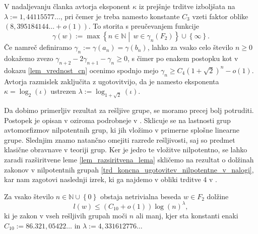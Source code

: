 V nadaljevanju članka \cite[str.~5--9]{Elkasapy_Thom_2013} avtorja eksponent $\kappa$ iz prejšnje trditve izboljšata na $\lambda := 1{,}44115577 \ldots$, pri čemer je treba namesto konstante $C_3$ vzeti faktor oblike $(8{,}395184144 \ldots + o(1))$. To storita s preučevanjem funkcije \begin{equation*}
\gamma(w) := \max \left\{ n \in  \mathbb{N}  \middle|\, w \in \gamma_{n}(F_2) \right\} \cup \left\{ \infty\right\}. 
\end{equation*}  
Če namreč definiramo $\gamma_n := \gamma(a_{n}) = \gamma(b_{n})$, lahko za vsako celo število $n \ge 0$ dokažemo zvezo $\gamma_{n + 2} - 2 \gamma_{n+1}  - \gamma_{n} \ge  0$, s čimer po enakem postopku kot v dokazu \ref{lem_vrednost_cn} ocenimo spodnjo mejo $\gamma_n \ge C_4 (1 + \sqrt{2})^{n} - o(1)$.
Avtorja razmislek zaključita z ugotovitvijo, da je namesto eksponenta $\kappa = \log_2( \iota)$ ustrezen $\lambda := \log_{1 + \sqrt{2}}(\iota)$.

Da dobimo primerljiv rezultat za rešljive grupe, se moramo precej bolj potruditi. Postopek je opisan v \cite[str.~3--4]{Thom_2015} oziroma podrobneje v \cite[str.~19--25]{Schneider_2016}. Sklicuje se na lastnosti grup avtomorfizmov nilpotentnih grup, ki jih vložimo
v primerne splošne linearne grupe. Slednjim znamo natančno omejiti razrede rešljivosti, saj so predmet klasične obravnave v teoriji grup. Ker je jedro te vložitve nilpotentno, se lahko zaradi razširitvene leme \ref{lem_razsiritvena_lema} skličemo na rezultat o dolžinah zakonov v nilpotentnih grupah \ref{trd_koncna_ugotovitev_nilpotentne_v_nalogi}, kar nam zagotovi naslednji izrek, ki ga najdemo v obliki trditve 4 v \cite[str.~25]{Schneider_2016}.  

\begin{izrek}
\label{izr_glavni_izrek_resljive}
 Za vsako število $n \in  \mathbb{N} \cup  \left\{ 0\right\}$ obstaja netrivialna beseda $w \in F_2$ dolžine \begin{equation*}
 l(w) \le (C_{10} + o(1)) \log(n)^{\lambda},
 \end{equation*}  
   ki je zakon v vseh rešljivih grupah moči $n$ ali manj, kjer sta konstanti enaki $C_{10} := 86.321{,}05422 \ldots$ in $\lambda := 4{,}331612776 \ldots$ 
\end{izrek}